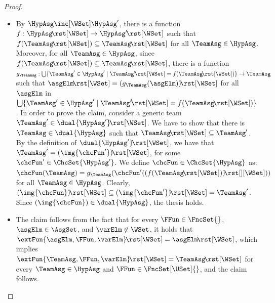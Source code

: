 \documentclass[authoryear]{elsarticle}
\begin{document}
\begin{proof}
%
%
  \begin{itemize}
  \item[\ref{lmm:mon(dlt)})] By $\HypAsg \inc[\WSet] \HypAsg'$, there is a
    function $f : \HypAsg \!\rst[\WSet] \rightarrow \HypAsg' \!\rst[\WSet]$ such
    that $f(\TeamAsg \!\rst[\WSet]) \subseteq \TeamAsg \!\rst[\WSet]$ for all
    $\TeamAsg \in \HypAsg$.
    Moreover, for all $\TeamAsg \in \HypAsg$, since $f(\TeamAsg \!\rst[\WSet])
    \subseteq \TeamAsg \!\rst[\WSet]$, there is a function $g_{\TeamAsg} :
    \bigcup \{ \TeamAsg' \in \HypAsg' \mid \TeamAsg' \!\rst[\WSet] = f(\TeamAsg
    \!\rst[\WSet]) \} \rightarrow \TeamAsg$ such that $\asgElm \!\rst[\WSet] =
    (g_{\TeamAsg}(\asgElm)) \!\rst[\WSet]$ for all $\asgElm$ in $\bigcup \{ \TeamAsg' \in \HypAsg' \mid \TeamAsg' \!\rst[\WSet] = f(\TeamAsg
    \!\rst[\WSet]) \}$.
%
    In order to prove the claim, consider a generic team $\TeamAsg' \in
    \dual{\HypAsg'} \!\rst[\WSet]$.
    We have to show that there is $\TeamAsg \in \dual{\HypAsg}$
    such that $\TeamAsg \!\rst[\WSet] \subseteq \TeamAsg'$.
    By the definition of $\dual{\HypAsg'} \!\rst[\WSet]$, we have that
    $\TeamAsg' = (\img{\chcFun'}) \!\rst[\WSet]$, for some $\chcFun' \in
    \ChcSet{\HypAsg'}$.
    We define $\chcFun \in \ChcSet{\HypAsg}$ as: $\chcFun(\TeamAsg) =
    g_{\TeamAsg}(\chcFun'(\asgExtW{(f(\TeamAsg \!\rst[\WSet]))}))$ for all
    $\TeamAsg \in \HypAsg$.
%
    Clearly, $(\img{\chcFun}) \!\rst[\WSet] \subseteq (\img{\chcFun'})
    \!\rst[\WSet] = \TeamAsg'$.
    Since $(\img{\chcFun})\in \dual{\HypAsg}$, the thesis holds.

  \item[\ref{lmm:mon(ext:eql)})] The claim follows from the fact that for every
    $\FFun \in \FncSet{}$, $\asgElm \in \AsgSet$, and $\varElm \not\in \WSet$,
    it holds that $\extFun{\asgElm, \FFun, \varElm} \!\rst[\WSet] = \asgElm
    \!\rst[\WSet]$, which implies $\extFun{\TeamAsg,
      \FFun, \varElm} \!\rst[\WSet] = \TeamAsg \!\rst[\WSet]$ for every
    $\TeamAsg \in \HypAsg$ and $\FFun \in \FncSet[\USet]{}$, and the claim
    follows.


\end{itemize}
\end{proof}
\end{document}
